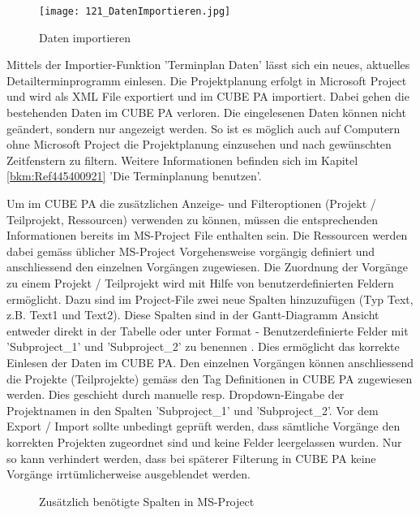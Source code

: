 \begin{figure}
\vspace{-15pt}
\texttt{[image: 121\_DatenImportieren.jpg]}
\caption{Daten importieren}
\end{figure}
Mittels der Importier-Funktion 'Terminplan Daten' lässt sich ein neues, aktuelles Detailterminprogramm einlesen. Die Projektplanung erfolgt in Microsoft Project und wird als XML File exportiert und im CUBE PA importiert. Dabei gehen die bestehenden Daten im CUBE PA verloren. Die eingelesenen Daten können nicht geändert, sondern nur angezeigt werden. So ist es möglich auch auf Computern ohne Microsoft Project die Projektplanung einzusehen und nach gewünschten Zeitfenstern zu filtern. Weitere Informationen befinden sich im Kapitel \ref{bkm:Ref445400921} 'Die Terminplanung benutzen'.

\vspace{\baselineskip}

Um im CUBE PA die zusätzlichen Anzeige- und Filteroptionen (Projekt / Teilprojekt, Ressourcen) verwenden zu können, müssen die entsprechenden Informationen bereits im MS-Project File enthalten sein. Die Ressourcen werden dabei gemäss üblicher MS-Project Vorgehensweise vorgängig definiert und anschliessend den einzelnen Vorgängen zugewiesen. Die Zuordnung der Vorgänge zu einem Projekt / Teilprojekt wird mit Hilfe von benutzerdefinierten Feldern ermöglicht. Dazu sind im Project-File zwei neue Spalten hinzuzufügen (Typ Text, z.B. Text1 und Text2). Diese Spalten sind in der Gantt-Diagramm Ansicht entweder direkt in der Tabelle oder unter Format - Benutzerdefinierte Felder mit 'Subproject\_1' und 'Subproject\_2' zu benennen . Dies ermöglicht das korrekte Einlesen der Daten im CUBE PA. Den einzelnen Vorgängen können anschliessend die Projekte (Teilprojekte) gemäss den Tag Definitionen in CUBE PA zugewiesen werden. Dies geschieht durch manuelle resp. Dropdown-Eingabe der Projektnamen in den Spalten 'Subproject\_1' und 'Subproject\_2'. Vor dem Export / Import sollte unbedingt geprüft werden, dass sämtliche Vorgänge den korrekten Projekten zugeordnet sind und keine Felder leergelassen wurden. Nur so kann verhindert werden, dass bei späterer Filterung in CUBE PA keine Vorgänge irrtümlicherweise ausgeblendet werden.

\begin{figure}[H]
\caption{Zusätzlich benötigte Spalten in MS-Project}
\end{figure}

